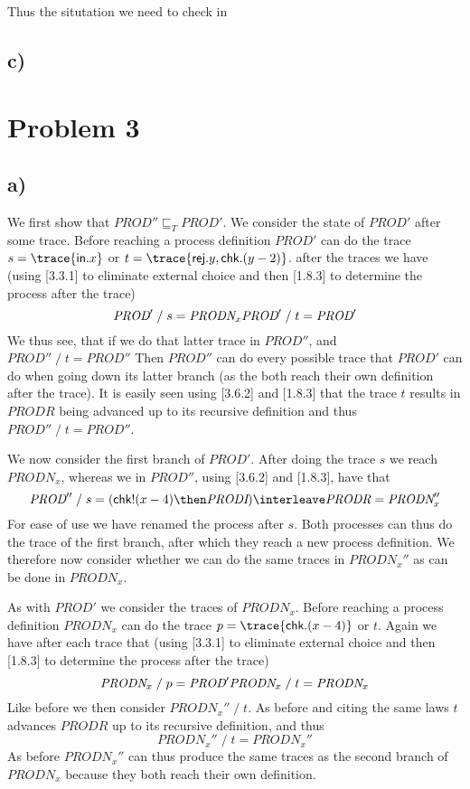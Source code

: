 \documentclass[a4paper, 11pt]{article}
\def\Prod{\textit{PROD}}
\def\Prodi{\textit{PRODI}}
\def\Prodr{\textit{PRODR}}
\def\Prodnx{\textit{PRODN}_x}
\def\inc{\textsf{in}}
\def\chk{\textsf{chk}}
\def\rej{\textsf{rej}}
\newcommand{\law}[2]{[#1\;\text{#2}]}
\def\after{\;/\;}
\begin{document}
Thus the situtation we need to check in 

\subsection{c)} %



\section{Problem 3} %
\label{sec:problem_3}

\subsection{a)} %
We first show that $\Prod'' \sqsubseteq_T \Prod'$. We consider the state of $\Prod'$ after some trace. Before reaching a process definition $\Prod'$ can do the trace $s = \trace{\inc . x}$ or $t = \trace{\rej . y, \chk . (y - 2)}$. after the traces we have (using \law{3.3.1}{L5} to eliminate external choice and then \law{1.8.3}{L3} to determine the process after the trace)
\[
    \Prod' \after s = \Prodnx \\
    \Prod' \after t = \Prod'
\]
We thus see, that if we do that latter trace in $\Prod''$, and $\Prod'' \after t = \Prod''$ Then $\Prod''$ can do every possible trace that $\Prod'$ can do when going down its latter branch (as the both reach their own definition after the trace). It is easily seen using \law{3.6.2}{L3} and \law{1.8.3}{L3A} that the trace $t$ results in $\Prodr$ being advanced up to its recursive definition and thus $\Prod'' \after t = \Prod''$.

We now consider the first branch of $\Prod'$. After doing the trace $s$ we reach $\Prodnx$, whereas we in $\Prod''$, using \law{3.6.2}{L3} and \law{1.8.3}{L3A}, have that
\[
    \Prod'' \after s = (\chk ! (x-4) \then \Prodi) \interleave \Prodr = \Prodnx''
\]
For ease of use we have renamed the process after $s$. Both processes can thus do the trace of the first branch, after which they reach a new process definition. We therefore now consider whether we can do the same traces in $\Prodnx''$ as can be done in $\Prodnx$.

As with $\Prod'$ we consider the traces of $\Prodnx$. Before reaching a process definition $\Prodnx$ can do the trace $p = \trace{\chk . (x-4)}$ or $t$. Again we have after each trace that (using \law{3.3.1}{L5} to eliminate external choice and then \law{1.8.3}{L3} to determine the process after the trace)
\[
    \Prodnx \after p = \Prod' \\
    \Prodnx \after t = \Prodnx
\]
Like before we then consider $\Prodnx'' \after t$. As before and citing the same laws $t$ advances $\Prodr$ up to its recursive definition, and thus
\[
    \Prodnx'' \after t = \Prodnx''
\]
As before $\Prodnx''$ can thus produce the same traces as the second branch of $\Prodnx$ because they both reach their own definition.
\end{document}
